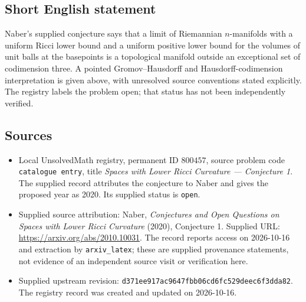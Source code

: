 \documentclass[11pt]{article}
\begin{document}
\subsection{Short English statement}
Naber's supplied conjecture says that a limit of Riemannian \(n\)-manifolds with a uniform Ricci lower bound and a uniform positive lower bound for the volumes of unit balls at the basepoints is a topological manifold outside an exceptional set of codimension three. A pointed Gromov--Hausdorff and Hausdorff-codimension interpretation is given above, with unresolved source conventions stated explicitly. The registry labels the problem open; that status has not been independently verified.
\subsection{Sources}
\begin{itemize}
\item Local UnsolvedMath registry, permanent ID \(800457\), source problem code \texttt{catalogue entry}, title \emph{Spaces with Lower Ricci Curvature --- Conjecture 1}. The supplied record attributes the conjecture to Naber and gives the proposed year as 2020. Its supplied status is \texttt{open}.
\item Supplied source attribution: Naber, \emph{Conjectures and Open Questions on Spaces with Lower Ricci Curvature} (2020), Conjecture 1. Supplied URL: \url{https://arxiv.org/abs/2010.10031}. The record reports access on 2026-10-16 and extraction by \texttt{arxiv\_latex}; these are supplied provenance statements, not evidence of an independent source visit or verification here.
\item Supplied upstream revision: \texttt{d371ee917ac9647fbb06cd6fc529deec6f3dda82}. The registry record was created and updated on 2026-10-16.
\end{itemize}
\end{document}
